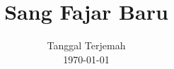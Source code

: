 \documentclass[a4paper, openany]{book}
\begin{document}
\pagestyle{empty}
\title{Sang Fajar Baru}
\date{Tanggal Terjemah\\
      \today}
\maketitle


\pagestyle{mystyle}
\setcounter{page}{1}
\end{document}
